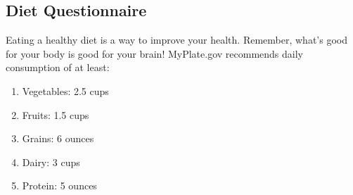 \subsection{Diet Questionnaire}

Eating a healthy diet is a way to improve your health. Remember, what’s good for your body is good for your brain! MyPlate.gov recommends daily consumption of at least:  
\begin{enumerate}
    \item Vegetables: 2.5 cups
    \item Fruits: 1.5 cups
    \item Grains: 6 ounces
    \item Dairy: 3 cups
    \item Protein: 5 ounces
\end{enumerate}
